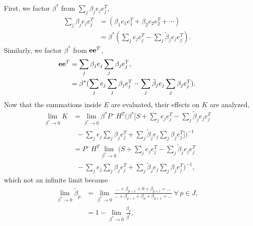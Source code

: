 \documentclass[letterpaper, 10pt, conference]{ieeeconf}
\begin{document}
\begin{appendix}
First, we factor $\beta^*$ from $\sum\limits_{j} \beta_{j}e_{j}e_{j}^T$,
\begin{align}
\sum\limits_{j} \beta_{j}e_{j}e_{j}^T&=(\beta_1e_1e_1^T+\beta_2e_2e_2^T+\cdots)\nonumber
\\
&=\beta^*(\sum\limits_{j}e_{j}e_{j}^T-\sum\limits_{j}\tilde\beta_je_{j}e_{j}^T).
\end{align}
Similarly, we factor $\beta^*$ from ${{\bf{e}}}{\bf{e}}^T$,
\begin{align}
{{\bf{e}}}{\bf{e}}^T&=\sum\limits_{j} \beta_{j}e_{j}\sum\limits_{j} \beta_{j}e_{j}^T,\nonumber
\\
&=\beta^*(\sum\limits_{j}e_{j}\sum\limits_{j}\beta_je_{j}^T-\sum\limits_{j}\tilde\beta_je_{j}\sum\limits_{j}\beta_je_{j}^T).
\end{align}
Now that the summations inside $E$ are evaluated, their effects on $K$ are analyzed,
\begin{align}
\lim_{\beta^* \to 0}K&=\lim_{\beta^* \to 0}\beta^*P^-H^T
(\beta^*[S+\sum\limits_{j}e_{j}e_{j}^T
-\sum\limits_{j}\tilde\beta_je_{j}e_{j}^T\nonumber\\
&\ \ -\sum\limits_{j}e_{j}\sum\limits_{j}\beta_je_{j}^T+\sum\limits_{j}\tilde\beta_je_{j}\sum\limits_{j}\beta_je_{j}^T])^{-1}\nonumber
\\
&=P^-H^T\lim_{\beta^* \to 0}
(S+\sum\limits_{j}e_{j}e_{j}^T-\sum\limits_{j}\tilde\beta_je_{j}e_{j}^T\nonumber
\\
&\ \ -\sum\limits_{j}e_{j}\sum\limits_{j}\beta_je_{j}^T+\sum\limits_{j}\tilde\beta_je_{j}\sum\limits_{j}\beta_je_{j}^T)^{-1},
\label{eqn:OptGainNoSingularity}
\end{align}
which not an infinite limit because
\begin{align}
\lim_{\beta^* \to 0}\tilde\beta_p&=\lim_{\beta^* \to 0}\frac{...+\beta_{p-1}+0+\beta_{p+1}+...}{...+\beta_{p-1}+\beta_p+\beta_{p+1}+...}\ \forall\ p\in J,\nonumber
\\
&=1-\lim_{\beta^* \to 0}\frac{\beta_p}{\beta^*},

\end{align}
\end{appendix}
\end{document}
